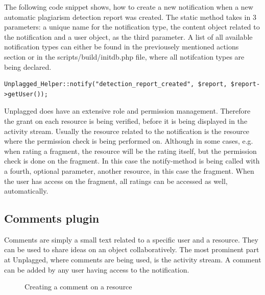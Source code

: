 The following code snippet shows, how to create a new notification when a new automatic plagiarism detection report was created. The static method takes in 3 parameters: a unique name for the notification type, the content object related to the notification and a user object, as the third parameter. A list of all available notification types can either be found in the previousely mentioned actions section or in the scripts/build/initdb.php file, where all notifcation types are being declared.

\begin{lstlisting}[caption=Creating a notification for a created report]
Unplagged_Helper::notify("detection_report_created", $report, $report->getUser());
\end{lstlisting}

Unplagged does have an extensive role and permission management. Therefore the grant on each resource is being verified, before it is being displayed in the activity stream. Usually the resource related to the notification is the resource where the permission check is being performed on. Although in some cases, e.g. when rating a fragment, the resource will be the rating itself, but the permission check is done on the fragment. In this case the notify-method is being called with a fourth, optional parameter, another resource, in this case the fragment. When the user has access on the fragment, all ratings can be accessed as well, automatically.

\subsection{Comments plugin}

Comments are simply a small text related to a specific user and a resource. They can be used to share ideas on an object collaboratively. The most prominent part at Unplagged, where comments are being used, is the activity stream. A comment can be added by any user having access to the notification. 

\begin{figure}[!h]
  \centering
  \caption{Creating a comment on a resource}
  \label{fig:creating-a-comment}
\end{figure}

